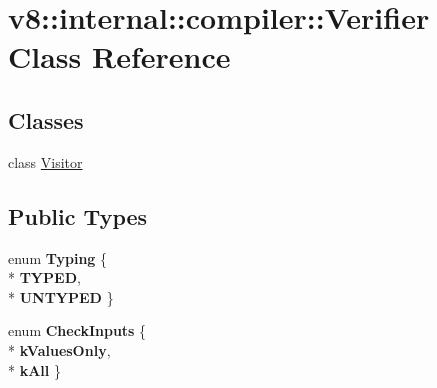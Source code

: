 \hypertarget{classv8_1_1internal_1_1compiler_1_1_verifier}{}\section{v8\+:\+:internal\+:\+:compiler\+:\+:Verifier Class Reference}
\label{classv8_1_1internal_1_1compiler_1_1_verifier}
\subsection*{Classes}
\begin{DoxyCompactItemize}
\item 
class \hyperlink{classv8_1_1internal_1_1compiler_1_1_verifier_1_1_visitor}{Visitor}
\end{DoxyCompactItemize}
\subsection*{Public Types}
\begin{DoxyCompactItemize}
\item 
enum {\bfseries Typing} \{ \\*
{\bfseries T\+Y\+P\+ED}, 
\\*
{\bfseries U\+N\+T\+Y\+P\+ED}
 \}\hypertarget{classv8_1_1internal_1_1compiler_1_1_verifier_a78ad088def8544aa3b97a7610387725e}{}\label{classv8_1_1internal_1_1compiler_1_1_verifier_a78ad088def8544aa3b97a7610387725e}

\item 
enum {\bfseries Check\+Inputs} \{ \\*
{\bfseries k\+Values\+Only}, 
\\*
{\bfseries k\+All}
 \}\hypertarget{classv8_1_1internal_1_1compiler_1_1_verifier_a7a26af4705f82708e0143d946405f184}{}\label{classv8_1_1internal_1_1compiler_1_1_verifier_a7a26af4705f82708e0143d946405f184}

\end{DoxyCompactItemize}
